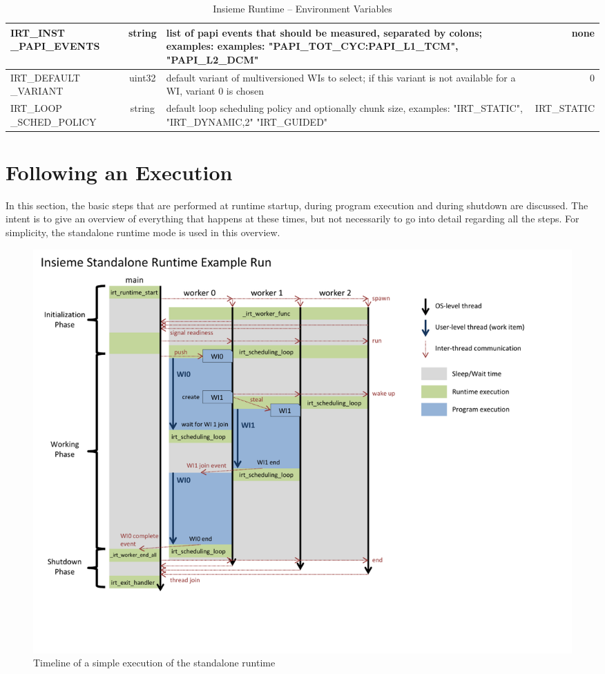 \begin{table}[htbp]
\begin{tabular}{|p{3cm}|c|p{7cm}|r|}
        IRT\_INST \_PAPI\_EVENTS           & string & list of papi events that should be measured, separated by colons; examples: examples: "PAPI\_TOT\_CYC:PAPI\_L1\_TCM", "PAPI\_L2\_DCM"                                                & none                \\ \hline
        IRT\_DEFAULT \_VARIANT               & uint32 & default variant of multiversioned WIs to select; if this variant is not available for a WI, variant 0 is chosen & 0                   \\ \hline
        IRT\_LOOP \_SCHED\_POLICY               & string & default loop scheduling policy and optionally chunk size, examples: "IRT\_STATIC", "IRT\_DYNAMIC,2" "IRT\_GUIDED" & IRT\_STATIC                   \\ \hline
    \end{tabular}
	\caption{Insieme Runtime -- Environment Variables}
	\label{tab:runtime:options:environment}
\end{table} 


\section{Following an Execution}
In this section, the basic steps that are performed at runtime startup, during program execution and during shutdown are discussed. The intent is to give an overview of everything that happens at these times, but not necessarily to go into detail regarding all the steps. For simplicity, the standalone runtime mode is used in this overview.

\begin{figure}[tb]
	\centering
	\includegraphics[width=\textwidth, trim=2cm 2cm 4cm 2cm]{pics/runtime/standalone_runtime_run.pdf}
	\caption{Timeline of a simple execution of the standalone runtime}
	\label{fig:runtime:execution}
\end{figure}


